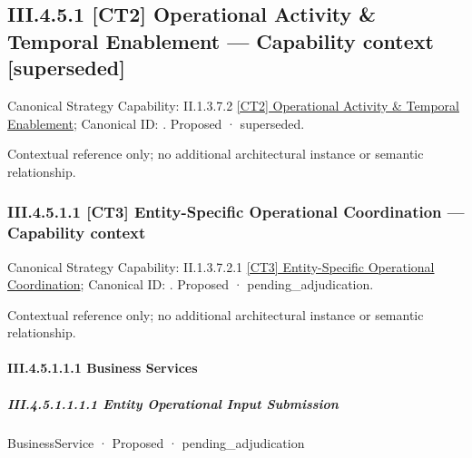 \subsection*{III.4.5.1 [CT2] Operational Activity \& Temporal Enablement — Capability context [superseded]}
\label{navigation:III.4.5.1}

{\small Canonical Strategy Capability: II.1.3.7.2 \hyperref[element:ca96b2b2ff434854995711e403e95f6f]{[CT2] Operational Activity \& Temporal Enablement}; Canonical ID: \texttt{}. Proposed · superseded.}\par
Contextual reference only; no additional architectural instance or semantic relationship.\par
\subsubsection*{III.4.5.1.1 [CT3] Entity-Specific Operational Coordination — Capability context}
\label{navigation:III.4.5.1.1}

{\small Canonical Strategy Capability: II.1.3.7.2.1 \hyperref[element:9f0c1429b64f4f88982fbbda6eaec233]{[CT3] Entity-Specific Operational Coordination}; Canonical ID: \texttt{}. Proposed · pending\_adjudication.}\par
Contextual reference only; no additional architectural instance or semantic relationship.\par
\paragraph*{III.4.5.1.1.1 Business Services}
\label{navigation:III.4.5.1.1.1}

\subparagraph*{III.4.5.1.1.1.1 Entity Operational Input Submission}
\label{navigation:III.4.5.1.1.1.1}

\label{element:6a27b36b624444d4b09e68f286045d46}
{\small BusinessService · Proposed · pending\_adjudication}\par

